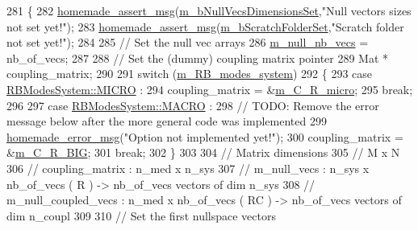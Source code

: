 \begin{DoxyCode}
281 \{
282     \hyperlink{common__header_8h_a593ccc80b790b2268653fcf6597bf451}{homemade\_assert\_msg}(\hyperlink{classcarl_1_1_f_e_t_i___operations_afd921550a2e18db731f244ea40688477}{m\_bNullVecsDimensionsSet},\textcolor{stringliteral}{"Null vectors
       sizes not set yet!"});
283     \hyperlink{common__header_8h_a593ccc80b790b2268653fcf6597bf451}{homemade\_assert\_msg}(\hyperlink{classcarl_1_1_f_e_t_i___operations_a8bb9de7de35a2f7d7d5982ae1085ba15}{m\_bScratchFolderSet},\textcolor{stringliteral}{"Scratch folder not set
       yet!"});
284 
285     \textcolor{comment}{// Set the null vec arrays}
286     \hyperlink{classcarl_1_1_f_e_t_i___operations_a6be71b08544858c4b4609bf2a2927a17}{m\_null\_nb\_vecs} = nb\_of\_vecs;
287 
288     \textcolor{comment}{// Set the (dummy) coupling matrix pointer}
289     Mat * coupling\_matrix;
290 
291     \textcolor{keywordflow}{switch} (\hyperlink{classcarl_1_1_f_e_t_i___operations_a1ca335075ea08144dd5756ad5969cb08}{m\_RB\_modes\_system})
292     \{
293         \textcolor{keywordflow}{case} \hyperlink{ext__solver__libmesh__enums_8h_acc44f45992a493fb31c90d260d4ab83fa44fead913cf8397fe4cf15b7c8962a8f}{RBModesSystem::MICRO} : 
294                 coupling\_matrix = &\hyperlink{classcarl_1_1_f_e_t_i___operations_aa2123fe549c1916496e9ea7e656bb7ee}{m\_C\_R\_micro};
295                 \textcolor{keywordflow}{break};
296 
297         \textcolor{keywordflow}{case} \hyperlink{ext__solver__libmesh__enums_8h_acc44f45992a493fb31c90d260d4ab83fa3d1738a931468da77c233f1126436b81}{RBModesSystem::MACRO} : 
298                 \textcolor{comment}{// TODO: Remove the error message below after the more general code was implemented}
299                 \hyperlink{common__header_8h_a05d65d26b911668ac90085745dca71f6}{homemade\_error\_msg}(\textcolor{stringliteral}{"Option not implemented yet!"});
300                 coupling\_matrix = &\hyperlink{classcarl_1_1_f_e_t_i___operations_a397d6a5e3e4111e06bb1ec52abdc6fa8}{m\_C\_R\_BIG};
301                 \textcolor{keywordflow}{break};
302     \}
303 
304     \textcolor{comment}{// Matrix dimensions}
305     \textcolor{comment}{//                       M     x N}
306     \textcolor{comment}{// coupling\_matrix     : n\_med x n\_sys}
307     \textcolor{comment}{// m\_null\_vecs         : n\_sys x nb\_of\_vecs ( R )  -> nb\_of\_vecs vectors of dim n\_sys}
308     \textcolor{comment}{// m\_null\_coupled\_vecs : n\_med x nb\_of\_vecs ( RC ) -> nb\_of\_vecs vectors of dim n\_coupl}
309 
310     \textcolor{comment}{// Set the first nullspace vectors}

\end{DoxyCode}
